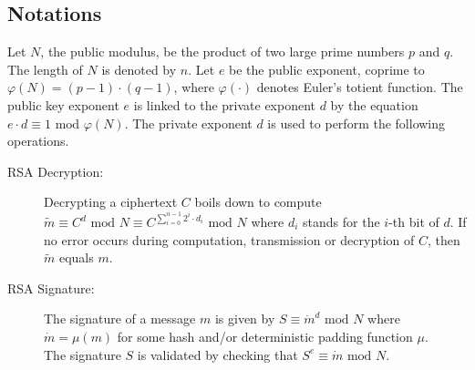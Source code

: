 \documentclass{article}
\begin{document}
\subsection{Notations}
Let $N$, the public modulus, be the product of two large prime numbers
$p$ and $q$. The length of $N$ is denoted by $n$. Let $e$ be the
public exponent, coprime to $\varphi(N)=(p-1) \cdot (q-1)$, where
$\varphi(\cdot)$ denotes Euler's totient function. The public key
exponent $e$ is linked to the private exponent $d$ by the equation 
$e \cdot d \equiv 1 \mbox{ mod } \varphi(N)$. The private exponent $d$ is
used to perform the following operations.
\begin{description}
 \item[RSA Decryption: ]Decrypting a ciphertext $C$ boils down to compute $\tilde{m} \equiv C^{d}\mbox{ mod }N 
 \equiv C^{\sum_{i=0}^{n-1} 2^{i} \cdot d_{i}}\mbox{ mod }N$ where $d_{i}$ stands for the $i$-th bit of $d$.
 If no error occurs during computation, transmission or decryption of $C$, then $\tilde{m}$ equals $m$.
 \item[RSA Signature: ]The signature of a message $m$ is given by $S \equiv \dot{m}^{d} \mbox{ mod } N$
		       where $\dot{m} = \mu(m)$ for some hash and/or deterministic padding function $\mu$.\\
		       The signature $S$ is validated by checking that $S^{e} \equiv \dot{m} \mbox{ mod } N$.
\end{description}
\end{document}
